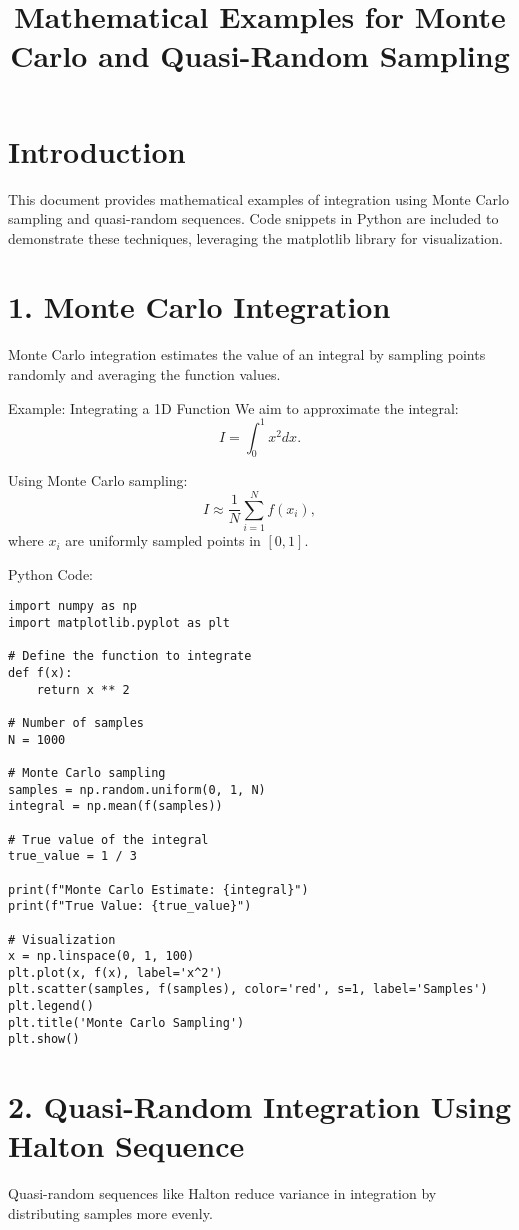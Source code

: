 \documentclass{article}
\title{Mathematical Examples for Monte Carlo and Quasi-Random Sampling}
\author{}
\date{}
\begin{document}
\maketitle

\section*{Introduction}
This document provides mathematical examples of integration using Monte Carlo sampling and quasi-random sequences. Code snippets in Python are included to demonstrate these techniques, leveraging the matplotlib library for visualization.

\section*{1. Monte Carlo Integration}
Monte Carlo integration estimates the value of an integral by sampling points randomly and averaging the function values.

 Example: Integrating a 1D Function
We aim to approximate the integral:
\[ I = \int_0^1 x^2 dx. \]

Using Monte Carlo sampling:
\[ I \approx \frac{1}{N} \sum_{i=1}^N f(x_i), \]
where \( x_i \) are uniformly sampled points in \([0, 1]\).

 Python Code:
\begin{lstlisting}[caption=Monte Carlo Integration for \(x^2\)]
import numpy as np
import matplotlib.pyplot as plt

# Define the function to integrate
def f(x):
    return x ** 2

# Number of samples
N = 1000

# Monte Carlo sampling
samples = np.random.uniform(0, 1, N)
integral = np.mean(f(samples))

# True value of the integral
true_value = 1 / 3

print(f"Monte Carlo Estimate: {integral}")
print(f"True Value: {true_value}")

# Visualization
x = np.linspace(0, 1, 100)
plt.plot(x, f(x), label='x^2')
plt.scatter(samples, f(samples), color='red', s=1, label='Samples')
plt.legend()
plt.title('Monte Carlo Sampling')
plt.show()
\end{lstlisting}

\section*{2. Quasi-Random Integration Using Halton Sequence}
Quasi-random sequences like Halton reduce variance in integration by distributing samples more evenly.
\end{document}
